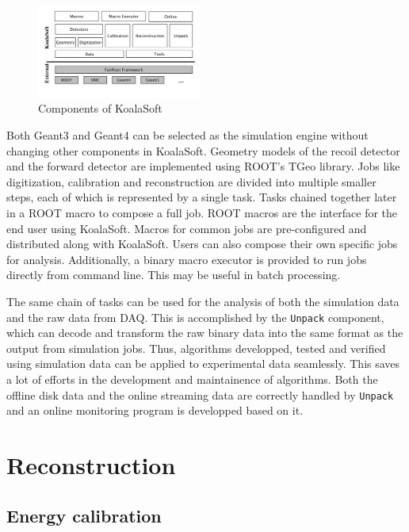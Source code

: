 \documentclass[number,5p]{elsarticle}
\begin{document}
\begin{figure}[htbp]
  \centering
  \includegraphics[width=0.48\textwidth]{./koalasoft_components.png}
  \caption{Components of KoalaSoft}
  \label{fig:koalasoft}
\end{figure}

Both Geant3 and Geant4 can be selected as the simulation engine without changing other components in KoalaSoft.
Geometry models of the recoil detector and the forward detector are implemented using ROOT's TGeo library.
Jobs like digitization, calibration and reconstruction are divided into multiple smaller steps, each of which is represented by a single task.
Tasks chained together later in a ROOT macro to compose a full job. 
ROOT macros are the interface for the end user using KoalaSoft.
Macros for common jobs are pre-configured and distributed along with KoalaSoft.
Users can also compose their own specific jobs for analysis.
Additionally, a binary macro executor is provided to run jobs directly from command line. This may be useful in batch processing.

The same chain of tasks can be used for the analysis of both the simulation data and the raw data from DAQ.
This is accomplished by the \texttt{Unpack} component, which can decode and transform the raw binary data into the same format as the output from simulation jobs.
Thus, algorithms developped, tested and verified using simulation data can be applied to experimental data seamlessly.
This saves a lot of efforts in the development and maintainence of algorithms.
Both the offline disk data and the online streaming data are correctly handled by \texttt{Unpack} and an online monitoring program is developped based on it.

\section{Reconstruction}
\label{sec:reconstruction}

\subsection{Energy calibration}
\label{sec:calibration}
\end{document}
